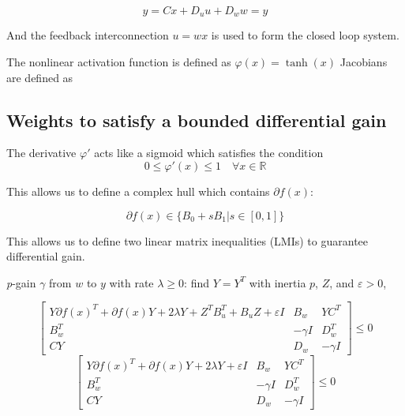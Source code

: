 \documentclass{article}
\begin{document}
\begin{equation}
    y = Cx + D_u u + D_w w = y
\end{equation}

And the feedback interconnection $u = w x$ is used to form the closed loop system.

The nonlinear activation function is defined as $\varphi(x) = \tanh(x)$ Jacobians are defined as

\subsection{Weights to satisfy a bounded differential gain}

The derivative $\varphi'$ acts like a sigmoid which satisfies the condition
\begin{equation}
    0 \leq \varphi'(x) \leq 1 \quad \forall x \in \mathbb{R}
\end{equation}

This allows us to define a complex hull which contains $\partial f(x)$:

\begin{equation}
    \partial f(x) \in \{ B_0 + sB_1 | s \in [0,1]\}
\end{equation}

This allows us to define two linear matrix inequalities (LMIs) to guarantee differential gain. 

\textit{p}-gain $\gamma$ from $w$ to $y$ with rate $\lambda \geq 0$: find $Y = Y^T$ with inertia $p$, $Z$, and $\varepsilon > 0$,

\begin{equation}
    \left[
    \begin{array}{ccc}
    Y \partial f(x)^T + \partial f(x) Y + 2 \lambda Y + Z^T B_u^T + B_u Z + \varepsilon I & B_w & YC^T \\
    B_w^T & -\gamma I & D_w^T \\
    CY & D_w & -\gamma I
    \end{array}
    \right] \leq 0
\end{equation}
\begin{equation}
    \left[
    \begin{array}{ccc}
    Y \partial f(x)^T + \partial f(x) Y + 2 \lambda Y + \varepsilon I & B_w & YC^T \\
    B_w^T & -\gamma I & D_w^T \\
    CY & D_w & -\gamma I
    \end{array}
    \right] \leq 0
\end{equation}
\end{document}
